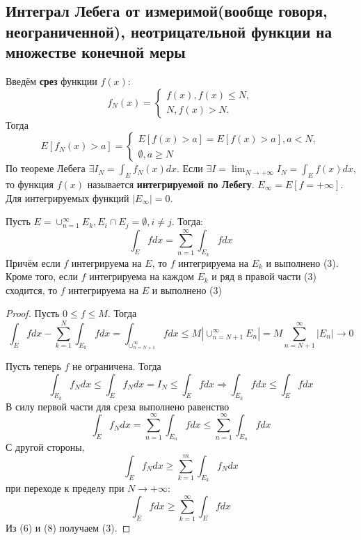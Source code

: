 \documentclass[11pt]{article}
\def\zall{\setcounter{lem}{0}\setcounter{cnsqnc}{0}\setcounter{th}{0}\setcounter{Cmt}{0}\setcounter{equation}{0}\setcounter{stnmt}{0}}
\newcounter{lem}\setcounter{lem}{0}
\newcounter{stnmt}\setcounter{stnmt}{0}
\newcounter{th}\setcounter{th}{0}
\def\th{\par\smallskip\refstepcounter{th}\textbf{\arabic{th}}}
\newtheorem*{Theorem}{Теорема \th}
\newcounter{cnsqnc}\setcounter{cnsqnc}{0}
\newcounter{Cmt}\setcounter{Cmt}{0}
\begin{document}
\subsection{Интеграл Лебега от измеримой(вообще говоря, неограниченной), неотрицательной функции на множестве конечной меры}
\label{sec:org2beb85e}
Введём \textbf{срез} функции \(f(x)\):
\zall
\begin{equation}
f_N(x) = \begin{cases}
f(x), f(x) \leq N, \\
N, f(x) > N.
\end{cases}
\end{equation}
Тогда
\begin{equation}
E[f_N(x) > a] = \begin{cases}
E[f(x) > a] = E[f(x) > a], a < N, \\
\emptyset, a \geq N
\end{cases}
\end{equation}
По теореме Лебега $\exists I_N = \int_Ef_N(x)dx$. Если
$\exists I = \lim_{N \to +\infty}I_N = \int_Ef(x)dx$, то функция $f(x)$ называется \textbf{интегрируемой
по Лебегу}. $E_{\infty} = E[f = +\infty]$. Для интегрируемых функций $|E_{\infty}| = 0$.
\begin{Theorem}
Пусть $E = \cup_{n = 1}^{\infty}E_k, E_i \cap E_j = \emptyset, i \neq j$. Тогда:
\begin{equation}
\int_Efdx = \sum_{n = 1}^{\infty}\int_{E_k}fdx
\end{equation}
Причём если $f$ интегрируема на $E$, то $f$ интегрируема на $E_k$ и выполнено (3). Кроме того,
если $f$ интегрируема на каждом $E_k$ и ряд в правой части (3) сходится, то $f$ интегрируема
на $E$ и выполнено (3)
\end{Theorem}
\begin{proof}
Пусть $0 \leq f \leq M$. Тогда
\begin{equation}
\int_Efdx - \sum_{k = 1}^N\int_{E_k}fdx = \int_{\cup_{n = N + 1}^{\infty}}fdx \leq M|\cup_{n = N + 1}^{\infty}E_n|
= M\sum_{n = N + 1}^{\infty}|E_n| \to 0
\end{equation}

Пусть теперь $f$ не ограничена. Тогда
\begin{equation}
\int_{E_k}f_Ndx \leq \int_Ef_Ndx = I_N \leq \int_Efdx \Rightarrow \int_{E_k}fdx \leq \int_Efdx
\end{equation}
В силу первой части для среза выполнено равенство
\begin{equation}
\int_Ef_Ndx = \sum_{n = 1}^{\infty}\int_{E_n}fdx \leq \sum_{n = 1}^{\infty}\int_{E_n}fdx
\end{equation}
С другой стороны,
\begin{equation}
\int_Ef_Ndx \geq \sum_{k = 1}^m\int_{E_k}f_Ndx
\end{equation}
при переходе к пределу при $N \to +\infty$:
\begin{equation}
\int_Efdx \geq \sum_{k = 1}^{\infty}\int_Efdx
\end{equation}
Из (6) и (8) получаем (3).
\end{proof}
\end{document}
